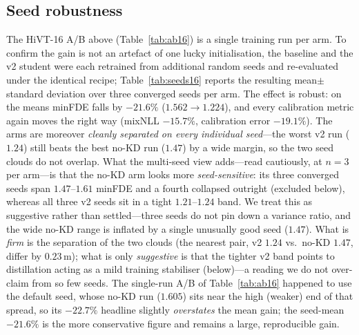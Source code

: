 \subsection{Seed robustness}
\label{ssec:res_seeds}
The HiVT-16 A/B above (Table~\ref{tab:ab16}) is a single training run per arm. To
confirm the gain is not an artefact of one lucky initialisation, the baseline and
the v2 student were each retrained from additional random seeds and re-evaluated
under the identical recipe; Table~\ref{tab:seeds16} reports the resulting
mean$\pm$standard deviation over three converged seeds per arm. The effect is
robust: on the means minFDE falls by $-21.6\%$ ($1.562\to1.224$), and every
calibration metric again moves the right way (mixNLL $-15.7\%$, calibration error
$-19.1\%$). The arms are moreover \emph{cleanly separated on every individual
seed}---the worst v2 run ($1.24$) still beats the best no-KD run ($1.47$) by a wide
margin, so the two seed clouds do not overlap. What the multi-seed view adds---read
cautiously, at $n{=}3$ per arm---is that the no-KD arm looks more
\emph{seed-sensitive}: its three converged seeds span $1.47$--$1.61$ minFDE and a
fourth collapsed outright (excluded below), whereas all three v2 seeds sit in a tight
$1.21$--$1.24$ band. We treat this as suggestive rather than settled---three seeds do
not pin down a variance ratio, and the wide no-KD range is inflated by a single
unusually good seed ($1.47$). What is \emph{firm} is the separation of the two clouds
(the nearest pair, v2 $1.24$ vs.\ no-KD $1.47$, differ by $0.23$\,m); what is only
\emph{suggestive} is that the tighter v2 band points to distillation acting as a mild
training stabiliser (below)---a reading we do not over-claim from so few seeds. The single-run
A/B of Table~\ref{tab:ab16} happened to use the default seed, whose no-KD run
($1.605$) sits near the high (weaker) end of that spread, so its $-22.7\%$ headline
slightly \emph{overstates} the mean gain; the seed-mean $-21.6\%$ is the more
conservative figure and remains a large, reproducible gain.

